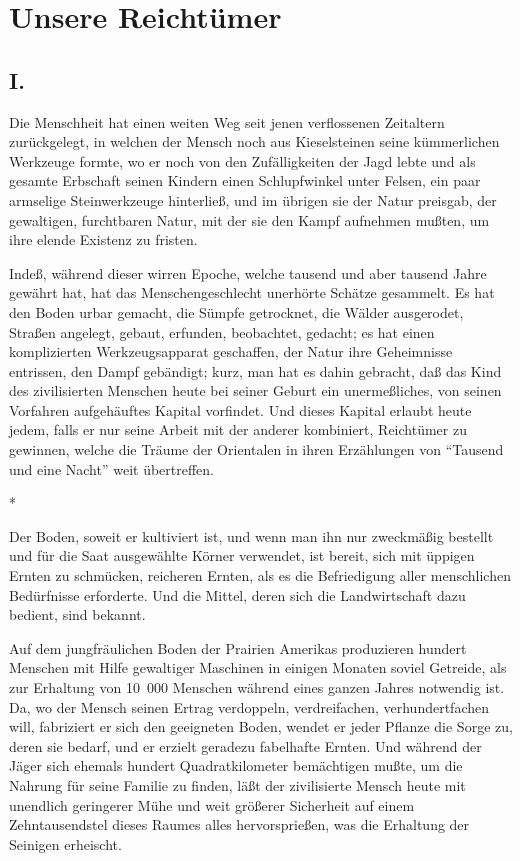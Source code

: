 \documentclass{scrbook}
\begin{document}
\hfill \textbf{}

\mainmatter
\chapter{Unsere Reichtümer}
\section*{I.}

Die Menschheit hat einen weiten Weg seit jenen verflossenen Zeitaltern zurückgelegt, in welchen der Mensch noch aus Kieselsteinen seine kümmerlichen Werkzeuge formte, wo er noch von den Zufälligkeiten der Jagd lebte und als gesamte Erbschaft seinen Kindern einen Schlupfwinkel unter Felsen, ein paar armselige Steinwerkzeuge hinterließ, und im übrigen sie der Natur preisgab, der gewaltigen, furchtbaren Natur, mit der sie den Kampf aufnehmen mußten, um ihre elende Existenz zu fristen.

Indeß, während dieser wirren Epoche, welche tausend und aber tausend Jahre gewährt hat, hat das Menschengeschlecht unerhörte Schätze gesammelt. Es hat den Boden urbar gemacht, die Sümpfe getrocknet, die Wälder ausgerodet, Straßen angelegt, gebaut, erfunden, beobachtet, gedacht; es hat einen komplizierten Werkzeugsapparat geschaffen, der Natur ihre Geheimnisse entrissen, den Dampf gebändigt; kurz, man hat es dahin gebracht, daß das Kind des zivilisierten Menschen heute bei seiner Geburt ein unermeßliches, von seinen Vorfahren aufgehäuftes Kapital vorfindet. Und dieses Kapital erlaubt heute jedem, falls er nur seine Arbeit mit der anderer kombiniert, Reichtümer zu gewinnen, welche die Träume der Orientalen in ihren Erzählungen von ``Tausend und eine Nacht'' weit übertreffen.

\begin{center}*\end{center}

Der Boden, soweit er kultiviert ist, und wenn man ihn nur zweckmäßig bestellt und für die Saat ausgewählte Körner verwendet, ist bereit, sich mit üppigen Ernten zu schmücken, reicheren Ernten, als es die Befriedigung aller menschlichen Bedürfnisse erforderte. Und die Mittel, deren sich die Landwirtschaft dazu bedient, sind bekannt.

Auf dem jungfräulichen Boden der Prairien Amerikas produzieren hundert Menschen mit Hilfe gewaltiger Maschinen in einigen Monaten soviel Getreide, als zur Erhaltung von 10~000 Menschen während eines ganzen Jahres notwendig ist. Da, wo der Mensch seinen Ertrag verdoppeln, verdreifachen, verhundertfachen will, fabriziert er sich den geeigneten Boden, wendet er jeder Pflanze die Sorge zu, deren sie bedarf, und er erzielt geradezu fabelhafte Ernten. Und während der Jäger sich ehemals hundert Quadratkilometer bemächtigen mußte, um die Nahrung für seine Familie zu finden, läßt der zivilisierte Mensch heute mit unendlich geringerer Mühe und weit größerer Sicherheit auf einem Zehntausendstel dieses Raumes alles hervorsprießen, was die Erhaltung der Seinigen erheischt.
\end{document}
